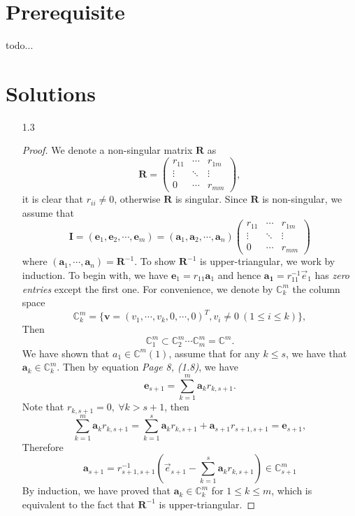 \section{Prerequisite}
todo...

\section{Solutions}

\begin{enumerate}
    \item [1.3] {
    \begin{proof}
    We denote a non-singular matrix $\bm{R}$ as
    $$
    \bm{R} = \left(\begin{array}{ccc}
         r_{11} & \cdots & r_{1m}  \\
         \vdots & \ddots & \vdots \\
         0 & \cdots & r_{mm}
    \end{array}\right),
    $$
    it is clear that $r_{ii} \neq 0$, otherwise $\bm{R}$ is singular. Since $\bm{R}$ is non-singular, we assume that
    \[ \bm{I} = (\bm{e}_1, \bm{e}_2, \cdots, \bm{e}_{m}) = (\bm{a}_1, \bm{a}_2, \cdots, \bm{a}_n)\left(\begin{array}{ccc}
         r_{11} & \cdots & r_{1m}  \\
         \vdots & \ddots & \vdots \\
         0 & \cdots & r_{mm}
    \end{array}\right)
    \]
    where $(\bm{a}_1, \cdots, \bm{a}_n) = \bm{R}^{-1}$. To show $\bm{R}^{-1}$ is upper-triangular, we work by induction. To begin with, we have $\bm{e}_1 = r_{11} \bm{a}_1$ and hence $\bm{a_1} = r_{11}^{-1} \vec{e}_1$ has \textit{zero entries} except the first one. For convenience, we denote by $\mathbb{C}^{m}_{k}$ the column space
    \[ \mathbb{C}_{k}^{m} = \{ \bm{v} = (v_1, \cdots, v_{k}, 0,\cdots, 0)^{T}, v_{i} \neq 0 ~(1\leq i \leq k)\}, \]
    Then
    \[ \mathbb{C}^{m}_1 \subset \mathbb{C}^{m}_{2} \cdots \mathbb{C}^{m}_{m}  = \mathbb{C}^{m}. \]
    We have shown that $a_1 \in \mathbb{C}^{m}(1)$, assume that for any $k \leq s$, we have that $\mathbf{a}_k \in \mathbb{C}^{m}_{k}$. Then by equation \textit{Page 8, (1.8)}, we have
    \[\bm{e}_{s+1} = \sum_{k=1}^{m} \bm{a}_k r_{k,s+1}.\]
    Note that $r_{k,s+1} = 0, ~\forall k > s+1$, then
    \[ \sum_{k=1}^{m} \bm{a}_k r_{k, s+1} = \sum_{k = 1}^{s} \bm{a}_k r_{k, s+1} + \bm{a}_{s+1} r_{s+1, s+1} = \bm{e}_{s+1},\]
    Therefore
    \[ \bm{a}_{s+1} = r_{s+1,s+1}^{-1} (\vec{e}_{s+1} - \sum_{k=1}^{s} \bm{a}_{k} r_{k,s+1}) \in \mathbb{C}^{m}_{s+1}\]
    By induction, we have proved that $\bm{a}_{k} \in \mathbb{C}^{m}_{k}$ for $1 \leq k \leq m$, which is equivalent to the fact that $\bm{R}^{-1}$ is upper-triangular.
    \end{proof}
    }
    

\end{enumerate}
